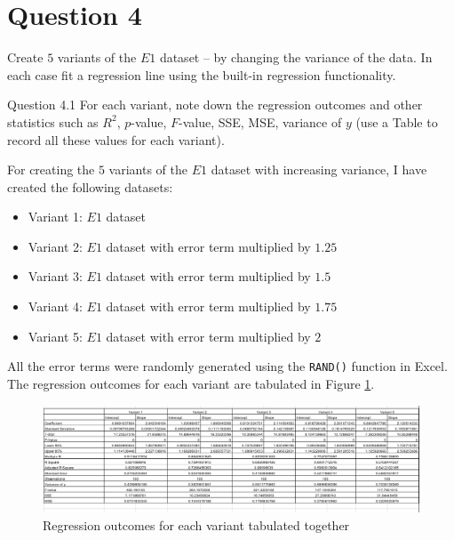 \section*{Question 4}

Create $5$ variants of the $E1$ dataset – by changing the variance of the data. In each case fit a regression line using the built-in regression functionality. 

\begin{custombox}[label={box:Q4.1}]{Question 4.1}
	For each variant, note down the regression outcomes and other statistics such as $R^2$, $p$-value, $F$-value, SSE, MSE, variance of $y$ (use a Table to record all these values for each variant).
\end{custombox}

For creating the $5$ variants of the $E1$ dataset with increasing variance, I have created the following datasets:

\begin{itemize}
	\item Variant 1: $E1$ dataset
	\item Variant 2: $E1$ dataset with error term multiplied by $1.25$	
	\item Variant 3: $E1$ dataset with error term multiplied by $1.5$
	\item Variant 4: $E1$ dataset with error term multiplied by $1.75$
	\item Variant 5: $E1$ dataset with error term multiplied by $2$
\end{itemize}

All the error terms were randomly generated using the \texttt{RAND()} function in Excel. The regression outcomes for each variant are tabulated in Figure \ref{fig:Q4.1}.

\begin{figure}[H]
	\centering
	\includegraphics[width=\textwidth]{Images/Q4_1.png}
	\caption{Regression outcomes for each variant tabulated together}
	\label{fig:Q4.1}
\end{figure}

\vspace{10mm}

